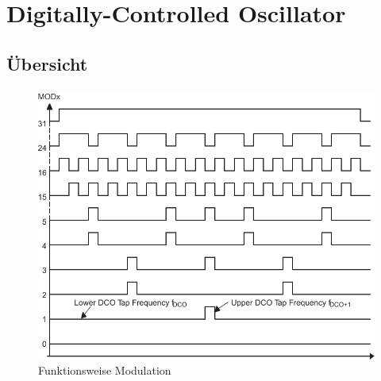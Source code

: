 
\section{Digitally-Controlled Oscillator}

\subsection{Übersicht}
\begin{frame}
    \frametitle{}
    \framesubtitle{}
      \begin{figure}
        \includegraphics[width=0.7\columnwidth]{fig/ti_fg_dco_mod.pdf}
        \caption{Funktionsweise Modulation}
      \end{figure}
  
\end{frame}